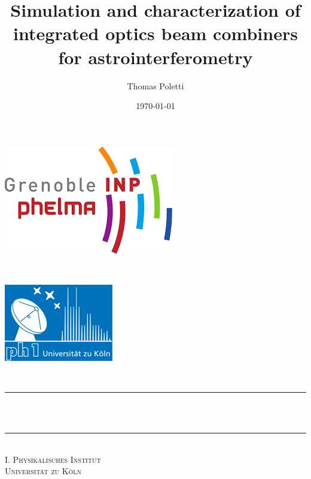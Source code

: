 \documentclass[a4paper,twoside,11pt]{article}
\title{Simulation and characterization of integrated optics beam combiners for astrointerferometry}								%
\author{Thomas Poletti}								%
\date{\today}											%
\makeatletter
\let\thetitle\@title
\makeatother
\begin{document}

\begin{titlepage}

	\begin{minipage}{0.5\textwidth}
		\begin{flushleft} 
    \includegraphics[scale = 0.6]{phelma.png}\\[1.0 cm]	%
			\end{flushleft}
			\end{minipage}~
			\begin{minipage}{0.5\textwidth}
            
			\begin{flushright} 
    
    \includegraphics[scale = .9]{university.png}\\[1.0 cm]	%
		\end{flushright}
        
	\end{minipage}\\[3 cm]
	
    \centering
    \vspace*{0.5 cm}
	\rule{\linewidth}{0.2 mm} \\[0.4 cm]
	{ \huge \bfseries \thetitle}\\
	\rule{\linewidth}{0.2 mm} \\[1.5 cm]
    \textsc{\Large I. Physikalisches Institut \\
Universität zu Köln}\\[5 cm]	%


\end{titlepage}
\end{document}

